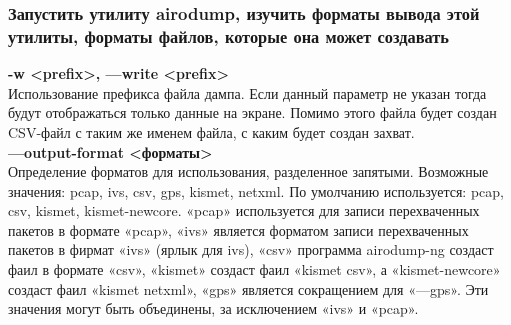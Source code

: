 \documentclass[10pt,a4paper]{report}
\begin{document}
\subsubsection{Запустить утилиту airodump, изучить форматы вывода этой утилиты, форматы файлов, которые она может создавать}
\textbf{-w <prefix>, —write <prefix>} \\

Использование префикса файла дампа. Если данный параметр не указан тогда будут отображаться только данные на экране. Помимо этого файла будет создан CSV-файл с таким же именем файла, с каким будет создан захват. \\

\textbf{—output-format <форматы>} \\

Определение форматов для использования, разделенное запятыми. Возможные значения: pcap, ivs, csv, gps, kismet, netxml. По умолчанию используется: pcap, csv, kismet, kismet-newcore. «pcap» используется для записи перехваченных пакетов в формате «pcap», «ivs» является форматом записи перехваченных пакетов в фирмат «ivs» (ярлык для ivs), «csv» программа airodump-ng создаст фаил в формате «csv», «kismet» создаст фаил «kismet csv», а «kismet-newcore» создаст фаил «kismet netxml», «gps» является сокращением для «—gps». Эти значения могут быть объединены, за исключением «ivs» и «pcap».
\end{document}
